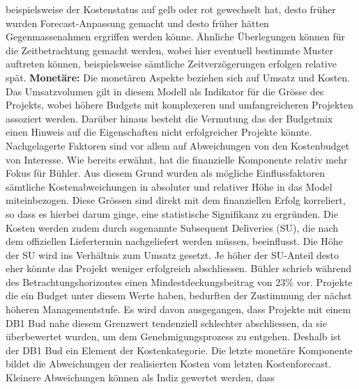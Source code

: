 beispielsweise der Kostenstatus auf gelb oder rot gewechselt hat, desto früher wurden Forecast-Anpassung gemacht und desto früher hätten Gegenmassenahmen ergriffen werden könne. Ähnliche Überlegungen können für die Zeitbetrachtung gemacht werden, wobei hier eventuell bestimmte Muster auftreten können, beispielsweise sämtliche Zeitverzögerungen erfolgen relative spät. 
\newline\newline\textbf{Monetäre:} Die monetären Aspekte beziehen sich auf Umsatz und Kosten. Das Umsatzvolumen gilt in diesem Modell als Indikator für die Grösse des Projekts, wobei höhere Budgets mit komplexeren und umfangreicheren Projekten assoziert werden. Darüber hinaus besteht die Vermutung das der Budgetmix einen Hinweis auf die Eigenschaften nicht erfolgreicher Projekte könnte.
\newline Nachgelagerte Faktoren sind vor allem auf Abweichungen von den Kostenbudget von Interesse. Wie bereits erwähnt, hat die finanzielle Komponente relativ mehr Fokus für Bühler. Aus diesem Grund wurden als mögliche Einflussfaktoren sämtliche Kostenabweichungen in absoluter und relativer Höhe in das Model miteinbezogen. Diese Grössen sind direkt mit dem finanziellen Erfolg korreliert, so dass es hierbei darum ginge, eine statistische Signifikanz zu ergründen. Die Kosten werden zudem durch sogenannte Subsequent Deliveries (SU), die nach dem offiziellen Liefertermin nachgeliefert werden müssen, beeinflusst. Die Höhe der SU wird ins Verhältnis zum Umsatz gesetzt. Je höher der SU-Anteil desto eher könnte das Projekt weniger erfolgreich abschliessen.
\newline Bühler schrieb während des Betrachtungshorizontes einen Mindestdeckungsbeitrag von 23\% vor. Projekte die ein Budget unter diesem Werte haben, bedurften der Zustimmung der nächst höheren Managementstufe. Es wird davon ausgegangen, dass Projekte mit einem DB1 Bud nahe diesem Grenzwert tendenziell schlechter abschliessen, da sie überbewertet wurden, um dem Genehmigungsprozess zu entgehen. Deshalb ist der DB1 Bud ein Element der Kostenkategorie.
\newline Die letzte monetäre Komponente bildet die Abweichungen der realisierten Kosten vom letzten Kostenforecast. Kleinere Abweichungen können als Indiz gewertet werden, dass 
